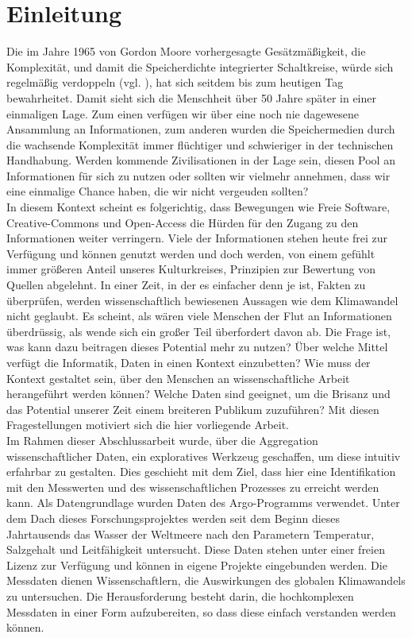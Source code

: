 
\section{Einleitung}


Die im Jahre 1965 von Gordon Moore vorhergesagte Gesätzmäßigkeit, die Komplexität, und damit die Speicherdichte integrierter Schaltkreise, würde sich regelmäßig verdoppeln (vgl. \cite{moore1998cramming}),  hat sich seitdem bis zum heutigen Tag bewahrheitet. Damit sieht sich die Menschheit über 50 Jahre später in einer einmaligen Lage.
Zum einen verfügen wir über eine noch nie dagewesene Ansammlung an Informationen, zum anderen wurden die Speichermedien durch die wachsende Komplexität immer flüchtiger und schwieriger in der technischen Handhabung. Werden kommende Zivilisationen in der Lage sein, diesen Pool an Informationen für sich zu nutzen oder sollten wir vielmehr annehmen, dass wir eine einmalige Chance haben, die wir nicht vergeuden sollten? \\

In diesem Kontext scheint es folgerichtig, dass Bewegungen wie Freie Software, Creative-Commons und Open-Access die Hürden für den Zugang zu den Informationen weiter verringern.  Viele der Informationen stehen heute frei zur Verfügung und können genutzt werden und doch werden, von einem gefühlt immer größeren Anteil unseres Kulturkreises, Prinzipien zur Bewertung von Quellen abgelehnt.
In einer Zeit, in der es einfacher denn je ist, Fakten zu überprüfen, werden wissenschaftlich bewiesenen Aussagen wie dem Klimawandel  nicht geglaubt.
Es scheint, als wären viele Menschen der Flut an Informationen überdrüssig, als wende sich ein großer Teil überfordert davon ab.
Die Frage ist, was kann dazu beitragen dieses Potential mehr zu nutzen?
Über welche Mittel verfügt die Informatik, Daten in einen Kontext einzubetten? Wie muss der Kontext gestaltet sein, über den Menschen an  wissenschaftliche Arbeit herangeführt werden können? Welche Daten sind geeignet, um die Brisanz und das Potential unserer Zeit einem breiteren Publikum zuzuführen?
Mit diesen Fragestellungen motiviert sich die hier vorliegende Arbeit.
\\
Im Rahmen dieser Abschlussarbeit wurde, über die Aggregation wissenschaftlicher Daten, ein exploratives Werkzeug geschaffen, um diese intuitiv erfahrbar zu gestalten. Dies geschieht mit dem Ziel, dass hier eine Identifikation mit den Messwerten und des wissenschaftlichen Prozesses zu erreicht werden kann. Als Datengrundlage wurden Daten des Argo-Programms verwendet. Unter dem Dach dieses Forschungsprojektes werden seit dem Beginn dieses Jahrtausends das Wasser der Weltmeere nach den Parametern Temperatur, Salzgehalt und Leitfähigkeit untersucht. Diese Daten stehen unter einer freien Lizenz zur Verfügung und können in eigene Projekte eingebunden werden.  Die Messdaten dienen Wissenschaftlern, die Auswirkungen des globalen Klimawandels zu untersuchen. Die Herausforderung besteht darin, die  hochkomplexen Messdaten in einer Form aufzubereiten, so dass diese einfach verstanden werden können.


